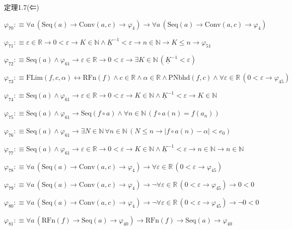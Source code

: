 \begin{fullproof}{定理1.7(⇐)}
\begin{abbrevlist}
\item $\varphi_{70} :\equiv \forall a\,(\mathrm{Seq}(a) \to \mathrm{Conv}(a,c) \to \varphi_{4}) \to \forall a\,(\mathrm{Seq}(a) \to \mathrm{Conv}(a,c) \to \varphi_{4})$
\item $\varphi_{71} :\equiv \varepsilon \in \mathbb{R} \to 0 < \varepsilon \to K \in \mathbb{N} \land \underline{K}^{-1} < \varepsilon \to n \in \mathbb{N} \to K \leq n \to \varphi_{51}$
\item $\varphi_{72} :\equiv \mathrm{Seq}(a) \land \varphi_{61} \to \varepsilon \in \mathbb{R} \to 0 < \varepsilon \to \exists K \in \mathbb{N}\,(\underline{K}^{-1} < \varepsilon)$
\item $\varphi_{73} :\equiv \mathrm{FLim}(f,c,\alpha) \leftrightarrow \mathrm{RFn}(f) \land c \in \mathbb{R} \land \alpha \in \mathbb{R} \land \mathrm{PNbhd}(f,c) \land \forall \varepsilon \in \mathbb{R}\,(0 < \varepsilon \to \varphi_{45})$
\item $\varphi_{74} :\equiv \mathrm{Seq}(a) \land \varphi_{61} \to \varepsilon \in \mathbb{R} \to 0 < \varepsilon \to K \in \mathbb{N} \land \underline{K}^{-1} < \varepsilon \to K \in \mathbb{N}$
\item $\varphi_{75} :\equiv \mathrm{Seq}(a) \land \varphi_{61} \to \mathrm{Seq}(f \circ a) \land \forall n \in \mathbb{N}\,(f \circ a(n) = f(a_{n}))$
\item $\varphi_{76} :\equiv \mathrm{Seq}(a) \land \varphi_{61} \to \exists N \in \mathbb{N}\,\forall n \in \mathbb{N}\,(N \leq n \to \lvert f \circ a(n) - \alpha \rvert < e_{0})$
\item $\varphi_{77} :\equiv \mathrm{Seq}(a) \land \varphi_{61} \to \varepsilon \in \mathbb{R} \to 0 < \varepsilon \to K \in \mathbb{N} \land \underline{K}^{-1} < \varepsilon \to n \in \mathbb{N} \to n \in \mathbb{N}$
\item $\varphi_{78} :\equiv \forall a\,(\mathrm{Seq}(a) \to \mathrm{Conv}(a,c) \to \varphi_{4}) \to \forall \varepsilon \in \mathbb{R}\,(0 < \varepsilon \to \varphi_{45})$
\item $\varphi_{79} :\equiv \forall a\,(\mathrm{Seq}(a) \to \mathrm{Conv}(a,c) \to \varphi_{4}) \to \neg \forall \varepsilon \in \mathbb{R}\,(0 < \varepsilon \to \varphi_{45}) \to 0 < 0$
\item $\varphi_{80} :\equiv \forall a\,(\mathrm{Seq}(a) \to \mathrm{Conv}(a,c) \to \varphi_{4}) \to \neg \forall \varepsilon \in \mathbb{R}\,(0 < \varepsilon \to \varphi_{45}) \to \neg 0 < 0$
\item $\varphi_{81} :\equiv \forall a\,(\mathrm{RFn}(f) \to \mathrm{Seq}(a) \to \varphi_{40}) \to \mathrm{RFn}(f) \to \mathrm{Seq}(a) \to \varphi_{40}$

\end{abbrevlist}
\end{fullproof}
